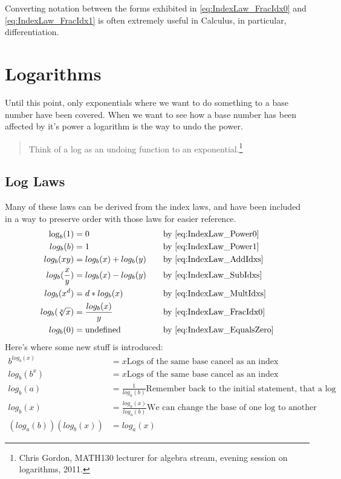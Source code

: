 Converting notation between the forms exhibited in
\ref{eq:IndexLaw_FracIdx0} and \ref{eq:IndexLaw_FracIdx1} is often
extremely useful in Calculus, in particular, differentiation.

\section{Logarithms}
\label{sec:Logarithms}
Until this point, only exponentials where we want to do something to a base
number have been covered. When we want to see how a base number has been
affected by it's power a logarithm is the way to undo the power.
\begin{quote}
  Think of a log as an undoing function to an exponential.\footnote{Chris
  Gordon, MATH130 lecturer for algebra stream, evening session on logarithms,
  2011.}
\end{quote}

\subsection{Log Laws}
\label{sec:LogLaws}
Many of these laws can be derived from the index laws, and have been included
in a way to preserve order with those laws for easier reference.
\begin{align}
  \log_b(1)           & = 0                         & \quad & \text{by
  \eqref{eq:IndexLaw_Power0}} \\ log_b(b)           & = 1                         & \quad & \text{by \eqref{eq:IndexLaw_Power1}} \\
  log_b(xy)          & = log_b(x) + log_b(y)       & \quad & \text{by \eqref{eq:IndexLaw_AddIdxs}} \\
  log_b(\frac{x}{y}) & = log_b(x) - log_b(y)       & \quad & \text{by \eqref{eq:IndexLaw_SubIdxs}} \\
  log_b(x^d)         & = d * log_b(x)              & \quad & \text{by \eqref{eq:IndexLaw_MultIdxs}} \\
  log_b(\sqrt[y]{x}) & = \frac{log_b(x)}{y}        & \quad & \text{by \eqref{eq:IndexLaw_FracIdx0}} \\
  log_b(0)           & = \text{undefined}          & \quad & \text{by \eqref{eq:IndexLaw_EqualsZero}} \\
\end{align}
Here's where some new stuff is introduced:
\begin{align}
  b^{log_b(x)}       & = x \text{Logs of the same base cancel as an index} \label{eq:LogLaw_BaseCancel0} \\
  log_b(b^x)         & = x \text{Logs of the same base cancel as an index} \label{eq:LogLaw_BaseCancel1} \\
  log_b(a)           & = \frac{1}{log_a(b)} \text{Remember back to the initial statement, that a log is an inverting function?} \label{eq:LogLaw_Inversion} \\
  log_b(x)           & = \frac{log_a(x)}{log_a(b)} \text{We can change the base of one log to another} \label{eq:LogLaw_ChangeBase} \\
  (log_a(b))(log_b(x)) & = log_a(x) 
%
\end{align}

